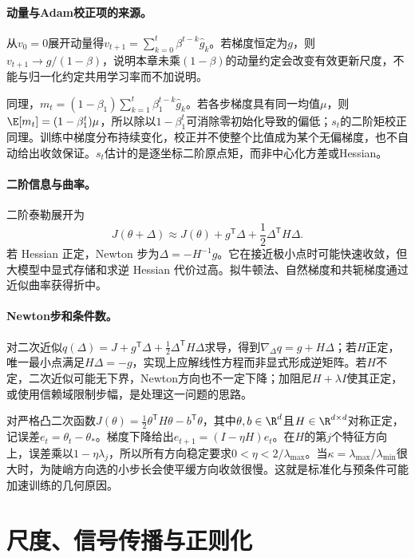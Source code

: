 \paragraph{动量与Adam校正项的来源。}
从$v_0=0$展开动量得$v_{t+1}=\sum_{k=0}^t\beta^{t-k}\hat g_k$。若梯度恒定为$g$，则$v_{t+1}\to g/(1-\beta)$，说明本章未乘$(1-\beta)$的动量约定会改变有效更新尺度，不能与归一化约定共用学习率而不加说明。

同理，$m_t=(1-\beta_1)\sum_{k=1}^t\beta_1^{t-k}\hat g_k$。若各步梯度具有同一均值$\mu$，则$\E[m_t]=(1-\beta_1^t)\mu$，所以除以$1-\beta_1^t$可消除零初始化导致的偏低；$s_t$的二阶矩校正同理。训练中梯度分布持续变化，校正并不使整个比值成为某个无偏梯度，也不自动给出收敛保证。$s_t$估计的是逐坐标二阶原点矩，而非中心化方差或Hessian。

\paragraph{二阶信息与曲率。}
二阶泰勒展开为
\begin{equation}
 J(\theta+\Delta)\approx J(\theta)+g^{\mathsf T}\Delta+\frac12\Delta^{\mathsf T}H\Delta.
\end{equation}
若 Hessian 正定，Newton 步为$\Delta=-H^{-1}g$。它在接近极小点时可能快速收敛，但大模型中显式存储和求逆 Hessian 代价过高。拟牛顿法、自然梯度和共轭梯度通过近似曲率获得折中。

\paragraph{Newton步和条件数。}
对二次近似$q(\Delta)=J+g^{\mathsf T}\Delta+\tfrac12\Delta^{\mathsf T}H\Delta$求导，得到$\nabla_\Delta q=g+H\Delta$；若$H$正定，唯一最小点满足$H\Delta=-g$，实现上应解线性方程而非显式形成逆矩阵。若$H$不定，二次近似可能无下界，Newton方向也不一定下降；加阻尼$H+\lambda I$使其正定，或使用信赖域限制步幅，是处理这一问题的思路。

对严格凸二次函数$J(\theta)=\tfrac12\theta^{\mathsf T}H\theta-b^{\mathsf T}\theta$，其中$\theta,b\in\R^d$且$H\in\R^{d\times d}$对称正定，记误差$e_t=\theta_t-\theta_*$。梯度下降给出$e_{t+1}=(I-\eta H)e_t$。在$H$的第$j$个特征方向上，误差乘以$1-\eta\lambda_j$，所以所有方向稳定要求$0<\eta<2/\lambda_{\max}$。当$\kappa=\lambda_{\max}/\lambda_{\min}$很大时，为陡峭方向选的小步长会使平缓方向收敛很慢。这就是标准化与预条件可能加速训练的几何原因。

\section{尺度、信号传播与正则化}
